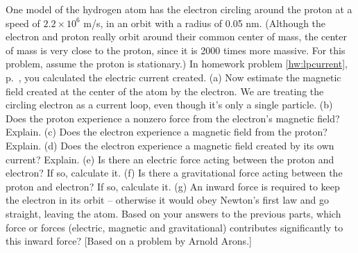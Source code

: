 One model of the hydrogen atom has the electron circling
around the proton at a speed of $2.2\times10^6$ m/s, in an
orbit with a radius of 0.05 nm. (Although the electron and
proton really orbit around their common center of mass, the
center of mass is very close to the proton, since it is 2000
times more massive. For this problem, assume the proton is
stationary.) In homework problem \ref{hw:lpcurrent}, p.~\pageref{hw:lpcurrent}, you
calculated the electric current created.\hwendpart
(a) Now estimate the magnetic field created at the center
of the atom by the electron. We are treating the circling
electron as a current loop, even though it's only a single particle.\answercheck\hwendpart
(b) Does the proton experience a nonzero force from the
electron's magnetic field? Explain.\hwendpart
(c) Does the electron experience a magnetic field from
the proton? Explain.\hwendpart
(d) Does the electron experience a magnetic field created by
its own current? Explain.\hwendpart
(e) Is there an electric force acting between the proton
and electron? If so, calculate it.\answercheck\hwendpart
(f) Is there a gravitational force acting between the proton
and electron? If so, calculate it.\hwendpart
(g) An inward force is required to keep the electron in its
orbit -- otherwise it would obey Newton's first law and go
straight, leaving the atom. Based on your answers to the
previous parts, which force or forces (electric, magnetic
and gravitational) contributes significantly to this inward force?\hwendpart
{[Based on a problem by Arnold Arons.]}

